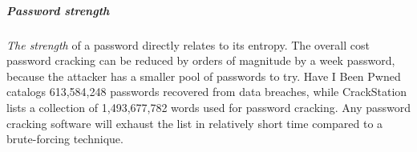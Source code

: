 \subparagraph{Password strength}
\textit{The strength} of a password directly relates to its entropy. The overall cost password cracking can be reduced by orders of magnitude by a week password, because the attacker has a smaller pool of passwords to try.
Have I Been Pwned \cite{hunt2021have} catalogs 613,584,248 passwords recovered from data breaches, while CrackStation \cite{hornby2019password} lists a collection of 1,493,677,782 words used for password cracking. Any password cracking software will exhaust the list in relatively short time compared to a brute-forcing technique.








